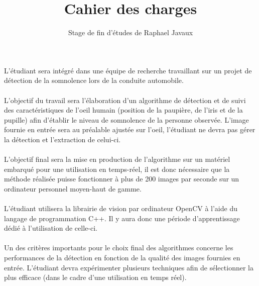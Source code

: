 \documentclass[a4paper,12pt]{article}
\title{Cahier des charges}
\author{Stage de fin d'études de Raphael Javaux}
\date{}
\begin{document}
\maketitle 

\paragraph{}
L'étudiant sera intégré dans une équipe de recherche travaillant sur un projet
de détection de la somnolence lors de la conduite automobile.

\paragraph{}
L'objectif du travail sera l'élaboration d'un algorithme de détection et de
suivi des caractéristiques de l'oeil humain (position de la paupière, de l'iris
et de la pupille) afin d'établir le niveau de somnolence de la
personne observée.
L'image fournie en entrée sera au préalable ajustée sur l'oeil, l'étudiant ne
devra pas gérer la détection et l'extraction de celui-ci. 

\paragraph{}
L'objectif final sera la mise en production de l'algorithme sur un matériel
embarqué pour une utilisation en temps-réel, il est donc nécessaire que la
méthode réalisée puisse fonctionner à plus de 200 images par seconde sur un
ordinateur personnel moyen-haut de gamme.

\paragraph{}
L'étudiant utilisera la librairie de vision par ordinateur OpenCV à l'aide du
langage de programmation C++. Il y aura donc une période d'apprentissage dédié
à l'utilisation de celle-ci.

\paragraph{}
Un des critères importants pour le choix final des algorithmes concerne les
performances de la détection en fonction de la qualité des images fournies en
entrée. L'étudiant devra expérimenter plusieurs techniques afin de sélectionner
la plus efficace (dans le cadre d'une utilisation en temps réel).
\end{document}
